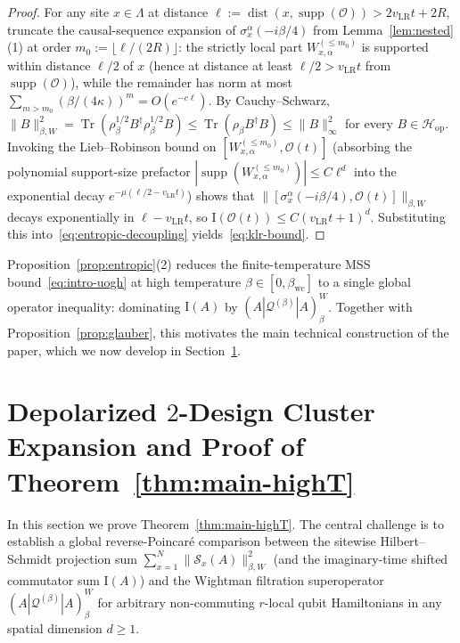 \documentclass[11pt,a4paper]{article}
\numberwithin{equation}{section}
\theoremstyle{plain}
\theoremstyle{definition}
\newcommand{\Hop}{\mathcal{H}_{\mathrm{op}}}
\newcommand{\Tr}{\operatorname{Tr}}
\newcommand{\supp}{\operatorname{supp}}
\newcommand{\dist}{\operatorname{dist}}
\begin{document}
\begin{proof}
For any site $x\in\Lambda$ at distance $\ell := \dist(x,\supp(\mathcal{O})) > 2v_{\mathrm{LR}}t + 2R$, truncate the causal-sequence expansion of $\sigma_x^\alpha(-i\beta/4)$ from Lemma~\ref{lem:nested}(1) at order $m_0 := \lfloor \ell/(2R)\rfloor$: the strictly local part $W_{x,\alpha}^{(\le m_0)}$ is supported within distance $\ell/2$ of $x$ (hence at distance at least $\ell/2 > v_{\mathrm{LR}}t$ from $\supp(\mathcal{O})$), while the remainder has norm at most $\sum_{m>m_0}(\beta/(4\kappa))^m = O(e^{-c\ell})$. By Cauchy--Schwarz, $\|B\|_{\beta,W}^2 = \Tr(\rho_\beta^{1/2}B^\dagger\rho_\beta^{1/2}B) \le \Tr(\rho_\beta B^\dagger B) \le \|B\|_\infty^2$ for every $B\in\Hop$. Invoking the Lieb--Robinson bound on $[W_{x,\alpha}^{(\le m_0)}, \mathcal{O}(t)]$ (absorbing the polynomial support-size prefactor $|\supp(W_{x,\alpha}^{(\le m_0)})| \le C\ell^d$ into the exponential decay $e^{-\mu(\ell/2 - v_{\mathrm{LR}}t)}$) shows that $\|[\sigma_x^\alpha(-i\beta/4),\mathcal{O}(t)]\|_{\beta,W}$ decays exponentially in $\ell - v_{\mathrm{LR}}t$, so $\mathrm{I}(\mathcal{O}(t)) \le C(v_{\mathrm{LR}}t+1)^d$. Substituting this into~\eqref{eq:entropic-decoupling} yields~\eqref{eq:klr-bound}.
\end{proof}

Proposition~\ref{prop:entropic}(2) reduces the finite-temperature MSS bound~\eqref{eq:intro-uogh} at high temperature $\beta\in[0,\beta_{\mathrm{wc}}]$ to a single global operator inequality: dominating $\mathrm{I}(A)$ by $(A|\mathcal{Q}^{(\beta)}|A)_\beta^W$. Together with Proposition~\ref{prop:glauber}, this motivates the main technical construction of the paper, which we now develop in Section~\ref{sec:highT}.

\section{Depolarized $2$-Design Cluster Expansion and Proof of Theorem~\ref{thm:main-highT}}\label{sec:highT}

In this section we prove Theorem~\ref{thm:main-highT}. The central challenge is to establish a global reverse-Poincar\'e comparison between the sitewise Hilbert--Schmidt projection sum $\sum_{x=1}^N \|\mathcal{S}_x(A)\|_{\beta,W}^2$ (and the imaginary-time shifted commutator sum $\mathrm{I}(A)$) and the Wightman filtration superoperator $(A|\mathcal{Q}^{(\beta)}|A)_\beta^W$ for arbitrary non-commuting $r$-local qubit Hamiltonians in any spatial dimension $d\ge 1$.
\end{document}
